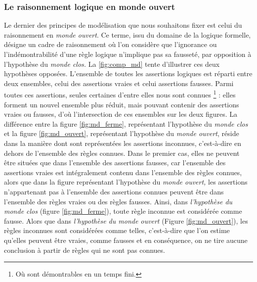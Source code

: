\subsubsection{Le raisonnement logique en monde ouvert}

Le dernier des principes de modélisation que nous souhaitons fixer est
celui du raisonnement en \emph{monde ouvert}. Ce terme, issu du
domaine de la logique formelle, désigne un cadre de raisonnement où
l'on considère que l'ignorance ou l'indémontrabilité d'une règle
logique n'implique pas sa fausseté, par opposition à l'hypothèse du
\emph{monde clos.} La \autoref{fig:comp_md} tente d'illustrer ces deux
hypothèses opposées. L'ensemble de toutes les assertions logiques est
réparti entre deux ensembles, celui des assertions vraies et celui
assertions fausses. Parmi toutes ces assertions, seules certaines
d'entre elles nous sont connues \footnote{Où sont démontrables en un
  temps fini.} : elles forment un nouvel ensemble plus réduit, mais
pouvant contenir des assertions vraies ou fausses, d'où l'intersection
de ces ensembles sur les deux figures. La différence entre la figure
\ref{fig:md_ferme}, représentant l'hypothèse du \emph{monde clos} et
la figure \ref{fig:md_ouvert}, représentant l'hypothèse du \emph{monde
  ouvert}, réside dans la manière dont sont représentées les
assertions inconnues, c'est-à-dire en dehors de l'ensemble des règles
connues. Dans le premier cas, elles ne peuvent être situées que dans
l'ensemble des assertions fausses, car l'ensemble des assertions
vraies est intégralement contenu dans l'ensemble des règles connues,
alors que dans la figure représentant l'hypothèse du \emph{monde
  ouvert,} les assertions n'appartenant pas à l'ensemble des
assertions connues peuvent être dans l'ensemble des règles vraies ou
des règles fausses. Ainsi, dans \emph{l'hypothèse du monde clos}
(figure \ref{fig:md_ferme}), toute règle inconnue est considérée comme
fausse. Alors que dans \emph{l'hypothèse du monde ouvert} (Figure
\ref{fig:md_ouvert}), les règles inconnues sont considérées comme
telles, c'est-à-dire que l'on estime qu'elles peuvent être vraies,
comme fausses et en conséquence, on ne tire aucune conclusion à partir
de règles qui ne sont pas connues.


